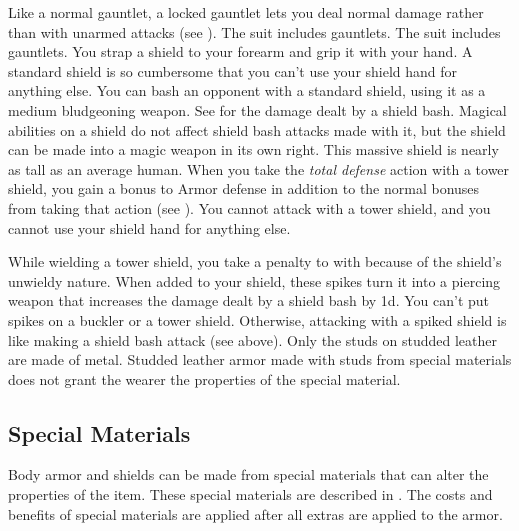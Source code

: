         Like a normal gauntlet, a locked gauntlet lets you deal normal damage rather than  with unarmed attacks (see ).
         The suit includes gauntlets.
         The suit includes gauntlets.
         You strap a shield to your forearm and grip it with your hand. A standard shield is so cumbersome that you can't use your shield hand for anything else.
         You can bash an opponent with a standard shield, using it as a medium bludgeoning weapon. See  for the damage dealt by a shield bash.
        Magical abilities on a shield do not affect shield bash attacks made with it, but the shield can be made into a magic weapon in its own right.
         This massive shield is nearly as tall as an average human.
        When you take the \textit{total defense} action with a tower shield, you gain a  bonus to Armor defense in addition to the normal bonuses from taking that action (see ).
        You cannot attack with a tower shield, and you cannot use your shield hand for anything else.

        While wielding a tower shield, you take a  penalty to  with  because of the shield's unwieldy nature.
         When added to your shield, these spikes turn it into a piercing weapon that increases the damage dealt by a shield bash by \plus1d. You can't put spikes on a buckler or a tower shield. Otherwise, attacking with a spiked shield is like making a shield bash attack (see above).
         Only the studs on studded leather are made of metal.
        Studded leather armor made with studs from special materials does not grant the wearer the properties of the special material.

    \subsection{Special Materials}\label{Special Materials}
        Body armor and shields can be made from special materials that can alter the properties of the item.
        These special materials are described in .
        The costs and benefits of special materials are applied after all extras are applied to the armor.


